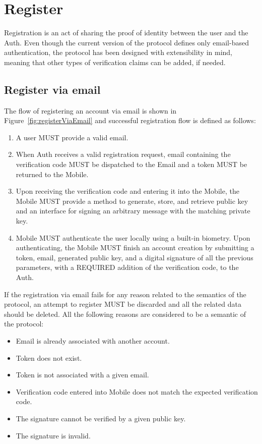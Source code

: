 \section{Register}
Registration is an act of sharing the proof of identity between the user and the Auth. Even though the current 
version of the protocol defines only email-based authentication, the protocol has been designed with 
extensibility in mind, meaning that other types of verification claims can be added, if needed.

      \subsection{Register via email}
      The flow of registering an account via email is shown in Figure~\ref{fig:registerViaEmail} and successful 
      registration flow is defined as follows:
      \begin{enumerate}
            \item A user MUST provide a valid email.
            \item When Auth receives a valid registration request, email containing the verification code MUST 
                  be dispatched to the Email and a token MUST be returned to the Mobile.
            \item Upon receiving the verification code and entering it into the Mobile, the Mobile MUST provide 
                  a method to generate, store, and retrieve public key and an interface for signing an arbitrary 
                  message with the matching private key.
            \item Mobile MUST authenticate the user locally using a built-in biometry. Upon authenticating, 
                  the Mobile MUST finish an account creation by submitting a token, email, generated public key, 
                  and a digital signature of all the previous parameters, with a REQUIRED addition of the 
                  verification code, to the Auth.
      \end{enumerate}
             
      If the registration via email fails for any reason related to the semantics of the protocol, an attempt to
      register MUST be discarded and all the related data should be deleted. All the following reasons are 
      considered to be a semantic of the protocol:
      \begin{itemize}
            \item Email is already associated with another account.
            \item Token does not exist.
            \item Token is not associated with a given email.
            \item Verification code entered into Mobile does not match the expected verification code.
            \item The signature cannot be verified by a given public key.
            \item The signature is invalid.
      \end{itemize}
